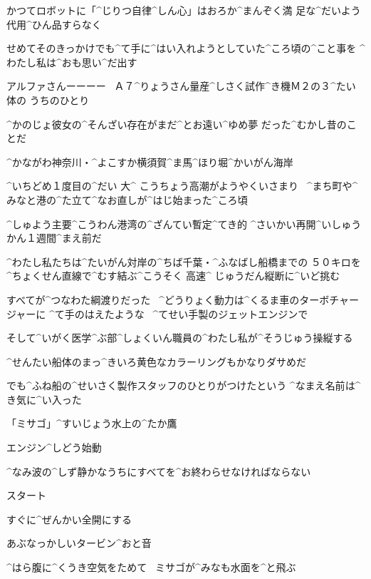 \Sensei かつてロボットに「^{じりつ}{自律}^{しん}{心}」はおろか^{まんぞく}{満
  足}な^{だいよう}{代用}^{ひん}{品}すらなく

\Sensei せめてそのきっかけでも^{て}{手}に^{はい}{入}れようとしていた^{ころ}{頃}の^{こと}{事}を
^{わたし}{私}は^{おも}{思}い^{だ}{出}す

\Sensei アルファさんーーーー
\ Ａ７^{りょうさん}{量産}^{しさく}{試作}^{き}{機}Ｍ２の３^{たい}{体}の
うちのひとり

\Sensei ^{かのじょ}{彼女}の^{そんざい}{存在}がまだ^{とお}{遠}い^{ゆめ}{夢}
だった^{むかし}{昔}のことだ

\page
\Sensei ^{かながわ}{神奈川}・^{よこすか}{横須賀}^{ま}{馬}^{ほり}{堀}^{かいがん}{海岸}

\Sensei ^{いちどめ}{１度目}の^{だい }{大}^{ こうちょう}{高潮}がようやくいさまり
\ ^{まち}{町}や^{みなと}{港}の^{た}{立}て^{なお}{直}しが^{はじ}{始}まった^{ころ}{頃}

\page
\Sensei ^{しゅよう}{主要}^{こうわん}{港湾}の^{ざんてい}{暫定}^{てき}{的}
^{さいかい}{再開}^{いしゅうかん}{１週間}^{まえ}{前}だ

\Sensei ^{わたし}{私}たちは^{たいがん}{対岸}の^{ちば}{千葉}・^{ふなばし}{船橋}までの
５０キロを^{ちょくせん}{直線}で^{むす}{結}ぶ^{こうそく }{高速}^{ じゅうだん}{縦断}に^{いど}{挑}む

\page
\Sensei すべてが^{つなわた}{綱渡}りだった
\ ^{どうりょく}{動力}は^{くるま}{車}のターボチャージャーに
^{て}{手}のはえたような
\ ^{てせい}{手製}のジェットエンジンで

\Sensei そして^{いがく}{医学}^{ぶ}{部}^{しょくいん}{職員}の^{わたし}{私}が^{そうじゅう}{操縦}する

\Sensei ^{せんたい}{船体}のまっ^{きいろ}{黄色}なカラーリングもかなりダサめだ

\Sensei でも^{ふね}{船}の^{せいさく}{製作}スタッフのひとりがつけたという
^{なまえ}{名前}は^{き}{気}に^{い}{入}った

\Sensei 「ミサゴ」^{すいじょう}{水上}の^{たか}{鷹}

\page
\Sensei エンジン^{しどう}{始動}

\Sensei ^{なみ}{波}の^{しず}{静}かなうちにすべてを^{お}{終}わらせなければならない

\page
\Sensei スタート

\page
\Sensei すぐに^{ぜんかい}{全開}にする

\Sensei あぶなっかしいタービン^{おと}{音}

\Sensei ^{はら}{腹}に^{くうき}{空気}をためて
\ ミサゴが^{みなも}{水面}を^{と}{飛}ぶ

